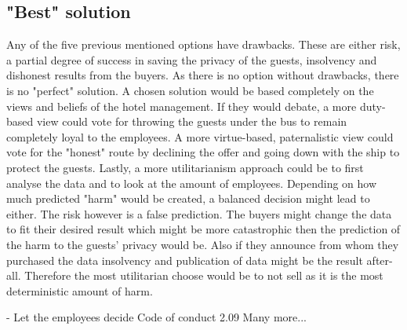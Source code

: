 \subsection{"Best" solution} 
Any of the five previous mentioned options have drawbacks. These are either risk, a partial degree of success in saving the privacy of the guests, insolvency and dishonest results from the buyers. As there is no option without drawbacks, there is no "perfect" solution. A chosen solution would be based completely on the views and beliefs of the hotel management. If they would debate, a more duty-based view could vote for throwing the guests under the bus to remain completely loyal to the employees. A more virtue-based, paternalistic view could vote for the "honest" route by declining the offer and going down with the ship to protect the guests. Lastly, a more utilitarianism approach could be to first analyse the data and to look at the amount of employees. Depending on how much predicted "harm" would be created, a balanced decision might lead to either. The risk however is a false prediction. The buyers might change the data to fit their desired result which might be more catastrophic then the prediction of the harm to the guests' privacy would be. Also if they announce from whom they purchased the data insolvency and publication of data might be the result after-all. Therefore the most utilitarian choose would be to not sell as it is the most deterministic amount of harm.




- Let the employees decide
Code of conduct 2.09
Many more...
